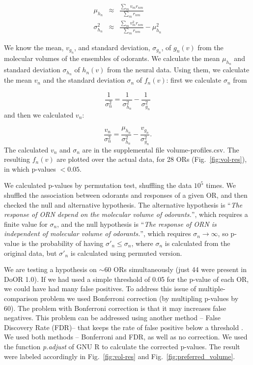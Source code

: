 \documentclass[fleqn,11pt]{wlscirep}
\newcommand{\numberofreceptors}{ 28 }
\begin{document}
\begin{eqnarray}
	\mu_{h_n} &\approx& \frac{\displaystyle \sum_{m} v_m r_{nm}}{\displaystyle \sum_{m} r_{nm}} \\
	\sigma_{h_n}^2 &\approx& \frac{\displaystyle \sum_{m} v_m^2 r_{nm}}{\displaystyle \sum_{m} r_{nm}} - \mu_{h_n}^2
	\label{eqn:final_h}
\end{eqnarray}


We know the mean, $v_{g_n}$, and standard deviation, $\sigma_{g_n}$, of $g_n(v)$ from the molecular volumes of the ensembles of odorants. 
We calculate the mean $\mu_{h_n}$ and standard deviation $\sigma_{h_n}$ of $h_n(v)$ from the neural data.
Using them, we calculate the mean $v_n$ and the standard deviation $\sigma_n$ of $f_n(v)$:
first we calculate $\sigma_n$ from 

\begin{equation}
	\frac{1}{\sigma_n^2} = \frac{1}{\sigma^2_{h_n}}  - \frac{1}{\sigma^2_{g_n}}
\end{equation}
and then we calculated $v_n$: 

\begin{equation}
	\frac{v_n}{\sigma_n^2}  =    \frac{\mu_{h_n}}{\sigma^2_{h_n}} - \frac{v_{g_n}}{\sigma^2_{g_n}}.
\end{equation}
The calculated $v_n$ and $\sigma_n$ are in the supplemental file volume-profiles.csv. 
The resulting $f_n(v)$ are plotted over the actual data, for \numberofreceptors ORs (Fig.~\ref{fig:vol-res}),
in which p-values $<0.05$. 

We calculated p-values by permutation test, shuffling the data $10^5$ times. 
We shuffled the association between odorants and responses of a given OR,  
and then checked the null and alternative hypothesis. 
The alternative hypothesis is
``{\it The response of ORN depend on the molecular volume of odorants.}'', 
which requires  a finite value for $\sigma_n$, 
and the null hypothesis is 
``{\it The response of ORN is independent of molecular volume of odorants.}'',
which requires $\sigma_n \rightarrow \infty$, 
so p-value is the probability of having $\sigma'_n\leq\sigma_n$, 
where $\sigma_n$ is calculated from the original data, but $\sigma'_n$ is calculated using permuted version. 

We are testing a hypothesis on $\sim$60 ORs simultaneously (just 44 were present in DoOR 1.0). 
If we had used a simple threshold of 0.05 for the p-value of each OR, we could have had many false positives. 
To address this issue of multiple-comparison problem 
we used Bonferroni correction (by multipling p-values by 60). 
The problem with Bonferroni correction is that it may increases false negatives.
This problem can be addressed using another method -- False Discovery Rate (FDR)--  that keeps the rate of false positive below a threshold \cite{benjamini1995controlling,shaffer1995multiple}.
We used both methods -- Bonferroni and FDR, as well as no correction. We used the function \textit{p.adjust} of GNU R to calculate the corrected p-values. 
The result were labeled accordingly in Fig.~\ref{fig:vol-res} and Fig.~\ref{fig:preferred_volume}.
\end{document}
